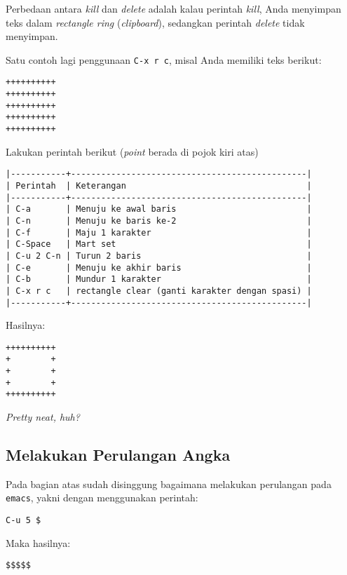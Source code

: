 \documentclass{article}
\begin{document}
Perbedaan antara \emph{kill} dan \emph{delete} adalah kalau perintah
\emph{kill}, Anda menyimpan teks dalam \emph{rectangle ring} 
(\emph{clipboard}), sedangkan perintah \emph{delete} tidak menyimpan.

Satu contoh lagi penggunaan \verb=C-x r c=, misal Anda memiliki teks berikut:

\begin{verbatim}
++++++++++
++++++++++
++++++++++
++++++++++
++++++++++
\end{verbatim}

Lakukan perintah berikut (\emph{point} berada di pojok kiri atas)

\begin{verbatim}
|-----------+-----------------------------------------------|
| Perintah  | Keterangan                                    |
|-----------+-----------------------------------------------|
| C-a       | Menuju ke awal baris                          |
| C-n       | Menuju ke baris ke-2                          |
| C-f       | Maju 1 karakter                               |
| C-Space   | Mart set                                      |
| C-u 2 C-n | Turun 2 baris                                 |
| C-e       | Menuju ke akhir baris                         |
| C-b       | Mundur 1 karakter                             |
| C-x r c   | rectangle clear (ganti karakter dengan spasi) |
|-----------+-----------------------------------------------|
\end{verbatim}

Hasilnya:

\begin{verbatim}
++++++++++
+        +
+        +
+        +
++++++++++
\end{verbatim}

\emph{Pretty neat, huh?}

\subsection{Melakukan Perulangan Angka}
Pada bagian atas sudah disinggung bagaimana melakukan perulangan pada 
\verb=emacs=, yakni dengan menggunakan perintah:

\begin{verbatim}
C-u 5 $
\end{verbatim}

Maka hasilnya:

\begin{verbatim}
$$$$$
\end{verbatim}
\end{document}
